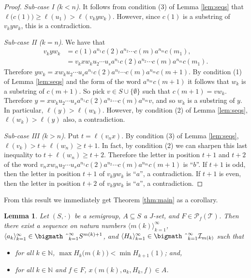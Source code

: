 \documentclass[12pt]{article}
\theoremstyle{plain}
\newtheorem{lem}[thm]{Lemma}
\theoremstyle{definition}
\newcommand{\la}{\langle}
\newcommand{\ra}{\rangle}
\newcommand{\bbN}{\mathbb{N}}
\newcommand{\calI}{\mathcal{I}}
\newcommand{\calT}{\mathcal{T}}
\newcommand{\Pf}{\mathcal{P}_f}
\newcommand{\bigtimes}{\hbox{\bigmath \char'2}}
\begin{document}
\begin{proof}
  \textsl{Sub-case I ($k<n$)}. 
  It follows from condition (3) of Lemma \ref{lem:seqs} that
  $\ell\bigl(c(1)\bigr) \ge \ell(u_1) > \ell(v_kyw_k)$.
  However, since $c(1)$ is a substring of $v_kyw_k$, this is a
  contradiction. 

  \textsl{Sub-case II ($k=n$)}.
  We have that 
    \begin{align*}
    v_kyw_k &= c(1)a^{n_1}c(2)a^{n_2} \cdots c(m)a^{n_m}c(m_1), \\
           &= v_kxw_ku_2 \cdots u_sa^{n_1}c(2)a^{n_2} \cdots 
           c(m)a^{n_m}c(m_1).
    \end{align*}
  Therefore $yw_k = xw_ku_2 \cdots u_sa^{n_1}c(2)a^{n_2} \cdots 
  c(m)a^{n_m}c(m+1)$.
  By condition (1) of Lemma \ref{lem:seqs} and the form of the 
  word $a^{n_m}c(m+1)$ it follows that $w_k$ is a substring of
  $c(m+1)$.
  So pick $v \in S\cup\{\emptyset\}$ such that $c(m+1) = vw_k$.
  Therefore $y = xw_ku_2 \cdots u_s a^{n_1}c(2)a^{n_2} \cdots 
  c(m)a^{n_m}v$, and so $w_k$ is a substring of $y$.
  In particular, $\ell(y) > \ell(w_k)$.
  However, by condition (2) of Lemma \ref{lem:seqs}, 
  $\ell(w_k) > \ell(y)$ also, a contradiction. 

  \textsl{Sub-case III ($k>n$)}. 
  Put $t = \ell(v_nx)$. 
  By condition (3) of Lemma \ref{lem:seqs}, $\ell(v_k) > t + 
  \ell(w_n) \ge t+1$. 
  In fact, by condition (2) we can sharpen this last inequality
  to $t + \ell(w_n) \ge t+2$. 
  Therefore the letter in position $t+1$ and $t+2$ of the word
  $v_nxw_nu_2 \cdots u_sa^{n_1}c(2)a^{n_2} \cdots c(m)a^{n_m}c(m+1)$
  is ``$b$''. 
  If $t+1$ is odd, then the letter in position $t+1$ of 
  $v_kyw_k$ is ``$a$'', a contradiction.
  If $t+1$ is even, then the letter in position $t+2$ of 
  $v_kyw_k$ is ``$a$'', a contradiction.
  \end{proof}

From this result we immediately get Theorem \ref{thm:main} 
as a corollary. 


\begin{lem}
  Let $(S, \cdot)$ be a semigroup, $A \subseteq S$ a $J$-set, and $F
  \in \Pf(\calT)$.
  Then there exist a sequence on natura numbers $\la m(k)
  \ra_{k=1}^\infty$, $\la a_k \ra_{k=1}^\infty \in
  \bigtimes_{k=1}^\infty S^{m(k)+1}$, and $\la H_k \ra_{k=1}^\infty
  \in \bigtimes_{k=1}^\infty \calI_{m(k)}$ such that
  \begin{itemize}
    \item[(1)] for all $k \in \bbN$, $\max H_k\bigl(m(k)\bigr) < \min
      H_{k+1}(1)$; and,

    \item[(2)] for all $k \in \bbN$ and $f \in F$, $x(m(k), a_k, H_k,
      f) \in A$.
  \end{itemize}
\end{lem}
\end{document}
